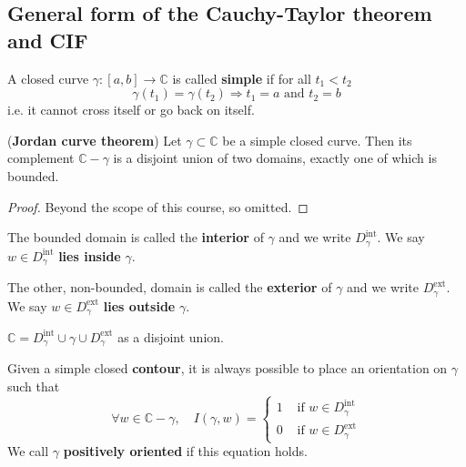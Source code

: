 \subsection{General form of the Cauchy-Taylor theorem and CIF}

\begin{definition}
	A closed curve $\gamma: [a, b] \rightarrow \mathbb{C}$ is called \textbf{simple} if for all $t_1 < t_2$
	\[
		\gamma(t_1) = \gamma(t_2) \Longrightarrow t_1 = a \text{ and } t_2 = b
	\]
	i.e. it cannot cross itself or go back on itself.
\end{definition}

\begin{theorem}
	(\textbf{Jordan curve theorem}) Let $\gamma \subset \mathbb{C}$ be a simple closed curve. Then its complement $\mathbb{C} - \gamma$ is a disjoint union of two domains, exactly one of which is bounded.
\end{theorem}

\begin{proof}
	Beyond the scope of this course, so omitted.
\end{proof}

\begin{definition}
	The bounded domain is called the \textbf{interior} of $\gamma$ and we write $D_{\gamma}^{\text{int}}$. We say $w \in D_{\gamma}^{\text{int}}$ \textbf{lies inside} $\gamma$.
\end{definition}

\begin{definition}
	The other, non-bounded, domain is called the \textbf{exterior} of $\gamma$ and we write $D_{\gamma}^{\text{ext}}$. We say $w \in D_{\gamma}^{\text{ext}}$ \textbf{lies outside} $\gamma$.
\end{definition}

\begin{remark}
	$\mathbb{C} = D_{\gamma}^{\text{int}} \cup \gamma \cup D_{\gamma}^{\text{ext}}$ as a disjoint union.
\end{remark}

\begin{remark}
	Given a simple closed \textbf{contour}, it is always possible to place an orientation on $\gamma$ such that
	\[
		\forall w \in \mathbb{C} - \gamma, \quad I(\gamma, w) = \begin{cases}
			1 & \text{ if } w \in D_{\gamma}^{\text{int}} \\
			0 & \text{ if } w \in D_{\gamma}^{\text{ext}}
		\end{cases}
	\]
	We call $\gamma$ \textbf{positively oriented} if this equation holds.
\end{remark}

